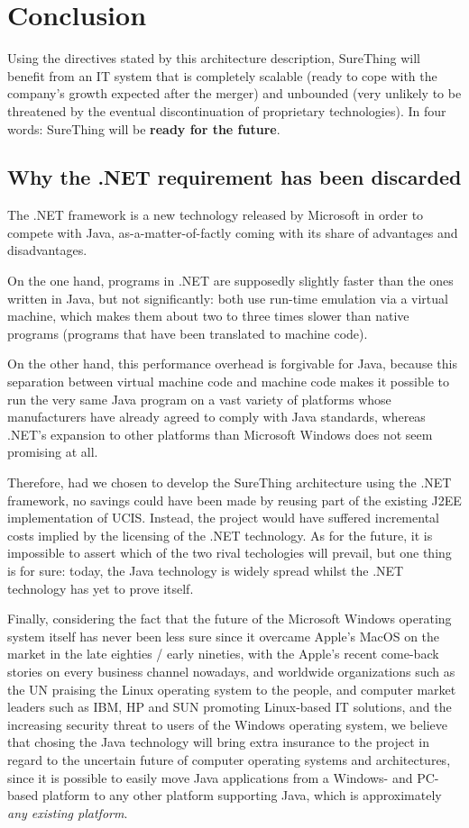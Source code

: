 \chapter{Conclusion}

Using the directives stated by this architecture description, SureThing will
benefit from an IT system that is completely scalable (ready to cope with the
company's growth expected after the merger) and unbounded (very unlikely to be
threatened by the eventual discontinuation of proprietary technologies).
In four words: SureThing will be \textbf{ready for the future}.


\section{Why the .NET requirement has been discarded}

The .NET framework is a new technology released by Microsoft
in order to compete with Java, as-a-matter-of-factly coming
with its share of advantages and disadvantages.

On the one hand, programs in .NET are supposedly slightly faster
than the ones written in Java, but not significantly: both use
run-time emulation via a virtual machine, which makes them about
two to three times slower than native programs (programs that
have been translated to machine code).

On the other hand, this performance overhead is forgivable for
Java, because this separation between virtual machine code and
machine code makes it possible to run the very same Java program
on a vast variety of platforms whose manufacturers have already
agreed to comply with Java standards, whereas .NET's expansion to
other platforms than Microsoft Windows does not seem promising at
all.

Therefore, had we chosen to develop the SureThing architecture
using the .NET framework, no savings could have been made by
reusing part of the existing J2EE implementation of UCIS. Instead,
the project would have suffered incremental costs implied by the
licensing of the .NET technology. As for the future, it is impossible
to assert which of the two rival techologies will prevail, but one
thing is for sure: today, the Java technology is widely spread
whilst the .NET technology has yet to prove itself.

Finally, considering the fact that the future of the Microsoft Windows
operating system itself has never been less sure since it overcame Apple's
MacOS on the market in the late eighties / early nineties, with the
Apple's recent come-back stories on every business channel nowadays,
and worldwide organizations such as the UN praising the Linux operating
system to the people, and computer market leaders such as IBM, HP and SUN
promoting Linux-based IT solutions, and the increasing security threat to
users of the Windows operating system, we believe that chosing the Java
technology will bring extra insurance to the project in regard to the
uncertain future of computer operating systems and architectures, since
it is possible to easily move Java applications from a Windows- and
PC-based platform to any other platform supporting Java, which is approximately
\textit{any existing platform}.


